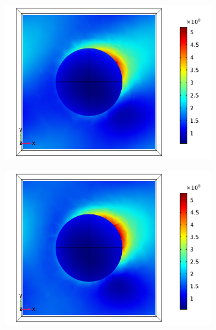 \begin{figure}[htb!]
    \begin{subfigure}{0.32\textwidth}    %
        \centering
        \includegraphics[width=\linewidth]{figures/ch4/S5A/FieldDistribution/phi25/z2/Sample5A_TM_Slice@z=+05Rz_wl=230_phi=25.png}
   \end{subfigure}
   \begin{subfigure}{0.32\textwidth}
        \centering
        \includegraphics[width=\linewidth]{figures/ch4/S5A/FieldDistribution/phi25/z2/Sample5A_TM_Slice@z=+05Rz_wl=255_phi=25.png}
   \end{subfigure}
   \begin{subfigure}{0.32\textwidth}
        \centering

\end{subfigure}
\end{figure}
